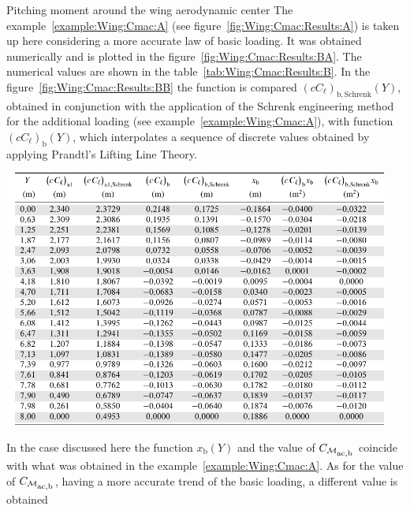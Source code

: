 \documentclass[[12pt,twoside]{book}
\begin{document}
%

%
\begin{myExampleX}{Pitching moment around the wing aerodynamic center}{}%
\label{example:Wing:Cmac:B}
%
\noindent
The example~\ref{example:Wing:Cmac:A} (see figure~\ref{fig:Wing:Cmac:Results:A}) is taken up here considering
a more accurate law of basic loading.
It was obtained numerically and is plotted in the figure~\ref{fig:Wing:Cmac:Results:BA}.
The numerical values are shown in the table~\ref{tab:Wing:Cmac:Results:B}.
%
In the figure~\ref{fig:Wing:Cmac:Results:BB} the function is compared
$(cC_\ell)_\mathrm{b,Schrenk}(Y)$, obtained in conjunction with the application of the Schrenk engineering method for the additional loading (see example~\ref{example:Wing:Cmac:A}),
with function $(cC_\ell)_\mathrm{b}(Y)$, which interpolates a sequence of discrete values
obtained by applying Prandtl's Lifting Line Theory.

\begin{table}[tb]
\caption{%
 Wing assigned in the examples~\ref{example:Wing:Cmac:A} and ~\ref{example:Wing:Cmac:B}.
Numerical values with which the basic loading was calculated $(cC_\ell)_\mathrm{b}$ 
  applying Prandtl's Lifting Line Theory..
}
\label{tab:Wing:Cmac:Results:B}
\centering
\includegraphics[width=0.95\textwidth]{Chapter_2/pitching_moment_two/wing_Cmac_2_loading_table.pdf}
\end{table}

In the case discussed here the function $x_\mathrm{b}(Y)$ and the value of
 $C_{\mathcal{M}_\mathlarger{\mathrm{ac,b}}}$ coincide with what was obtained
in the example~\ref{example:Wing:Cmac:A}.
As for the value of $C_{\mathcal{M}_\mathlarger{\mathrm{ac,b}}}$, having a more accurate trend of the basic loading, a different value is obtained


\end{myExampleX}
\end{document}
